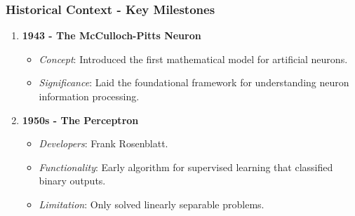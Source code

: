 \documentclass{beamer}
\begin{document}
\begin{frame}[fragile]
    \frametitle{Historical Context - Key Milestones}
    \begin{enumerate}
        \item \textbf{1943 - The McCulloch-Pitts Neuron}
            \begin{itemize}
                \item \textit{Concept}: Introduced the first mathematical model for artificial neurons.
                \item \textit{Significance}: Laid the foundational framework for understanding neuron information processing.
            \end{itemize}
        
        \item \textbf{1950s - The Perceptron}
            \begin{itemize}
                \item \textit{Developers}: Frank Rosenblatt.
                \item \textit{Functionality}: Early algorithm for supervised learning that classified binary outputs.
                \item \textit{Limitation}: Only solved linearly separable problems.
            \end{itemize}
    \end{enumerate}
\end{frame}
\end{document}
